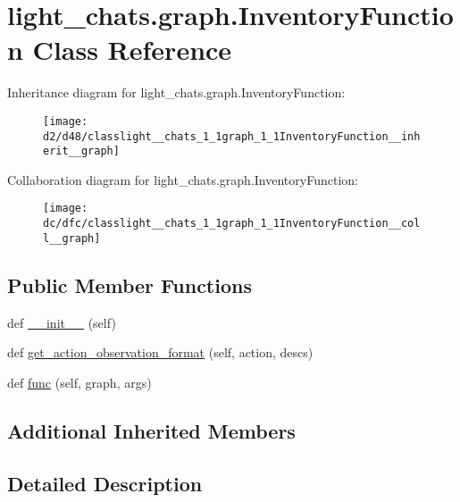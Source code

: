 \hypertarget{classlight__chats_1_1graph_1_1InventoryFunction}{}\section{light\+\_\+chats.\+graph.\+Inventory\+Function Class Reference}
\label{classlight__chats_1_1graph_1_1InventoryFunction}


Inheritance diagram for light\+\_\+chats.\+graph.\+Inventory\+Function\+:\nopagebreak
\begin{figure}[H]
\begin{center}
\leavevmode
\texttt{[image: d2/d48/classlight\_\_chats\_1\_1graph\_1\_1InventoryFunction\_\_inherit\_\_graph]}
\end{center}
\end{figure}


Collaboration diagram for light\+\_\+chats.\+graph.\+Inventory\+Function\+:\nopagebreak
\begin{figure}[H]
\begin{center}
\leavevmode
\texttt{[image: dc/dfc/classlight\_\_chats\_1\_1graph\_1\_1InventoryFunction\_\_coll\_\_graph]}
\end{center}
\end{figure}
\subsection*{Public Member Functions}
\begin{DoxyCompactItemize}
\item 
def \hyperlink{classlight__chats_1_1graph_1_1InventoryFunction_a4fa076967af0f8541f53e92721777f27}{\+\_\+\+\_\+init\+\_\+\+\_\+} (self)
\item 
def \hyperlink{classlight__chats_1_1graph_1_1InventoryFunction_a9527cd8b211efa8aafc21b2a40b14760}{get\+\_\+action\+\_\+observation\+\_\+format} (self, action, descs)
\item 
def \hyperlink{classlight__chats_1_1graph_1_1InventoryFunction_ae1d63ccf80bca5e20060ca5ffb8a684a}{func} (self, graph, args)
\end{DoxyCompactItemize}
\subsection*{Additional Inherited Members}


\subsection{Detailed Description}


